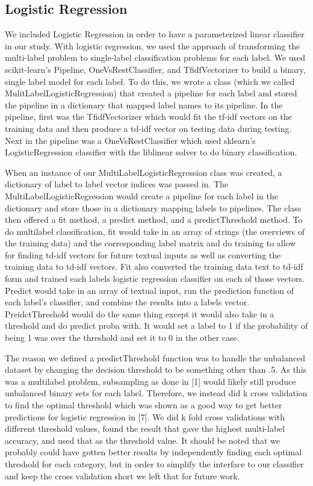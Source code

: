\documentclass[sigconf]{acmart}
\begin{document}
\subsection{Logistic Regression}
We included Logistic Regression in order to have a parameterized linear classifier in our study. With logistic regression, we used the approach of transforming the multi-label problem to single-label classification problems for each label. We used scikit-learn's Pipeline, OneVsRestClassifier, and TfidfVectorizer to build a binary, single label model for each label.  To do this, we wrote a class (which we called MulitLabelLogisticRegression) that created a pipeline for each label and stored the pipeline in a dictionary that mapped label names to its pipeline. In the pipeline, first was the TfidfVectorizer which would fit the tf-idf vectors on the training data and then produce a td-idf vector on testing data during testing.  Next in the pipeline was a OneVsRestClassifier which used sklearn's LogisticRegression classifier with the liblinear solver to do binary classification. 

When an instance of our MultiLabelLogisticRegression class was created, a dictionary of label to label vector indices was passed in.  The MultiLabelLogisticRegression would create a pipeline for each label in the dictionary and store those in a dictionary mapping labels to pipelines. The class then offered a fit method, a predict method, and a predictThreshold method. To do multilabel classification, fit would take in an array of strings (the overviews of the training data) and the corresponding label matrix and do training to allow for finding td-idf vectors for future textual inputs as well as converting the training data to td-idf vectors. Fit also converted the training data text to td-idf form and trained each labels logistic regression classifier on each of those vectors. Predict would take in an array of textual input, run the prediction function of each label's classifier, and combine the results into a labels vector.  PreidctThreshold would do the same thing except it would also take in a threshold and do predict proba with. It would set a label to 1 if the probability of being 1 was over the threshold and set it to 0 in the other case. 

The reason we defined a predictThreshold function was to handle the unbalanced dataset by changing the decision threshold to be something other than .5.  As this was a multilabel problem, subsampling as done in [1] would likely still produce unbalanced binary sets for each label.  Therefore, we instead did k cross validation to find the optimal threshold which was shown as a good way to get better predictions for logistic regression in [7]. We did k fold cross validations with different threshold values, found the result that gave the highest multi-label accuracy, and used that as the threshold value.  It should be noted that we probably could have gotten better results by independently finding each optimal threshold for each category, but in order to simplify the interface to our classifier and keep the cross validation short we left that for future work. 
\end{document}

